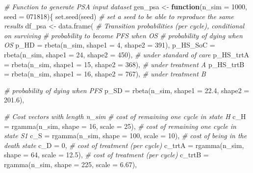 \documentclass[
]{article}
\newenvironment{Shaded}{\begin{snugshade}}{\end{snugshade}}
\newcommand{\AttributeTok}[1]{\textcolor[rgb]{0.77,0.63,0.00}{#1}}
\newcommand{\CommentTok}[1]{\textcolor[rgb]{0.56,0.35,0.01}{\textit{#1}}}
\newcommand{\ControlFlowTok}[1]{\textcolor[rgb]{0.13,0.29,0.53}{\textbf{#1}}}
\newcommand{\DecValTok}[1]{\textcolor[rgb]{0.00,0.00,0.81}{#1}}
\newcommand{\FloatTok}[1]{\textcolor[rgb]{0.00,0.00,0.81}{#1}}
\newcommand{\FunctionTok}[1]{\textcolor[rgb]{0.00,0.00,0.00}{#1}}
\newcommand{\NormalTok}[1]{#1}
\newcommand{\OtherTok}[1]{\textcolor[rgb]{0.56,0.35,0.01}{#1}}
\begin{document}
\begin{Shaded}
\begin{Highlighting}[]
\CommentTok{\# Function to generate PSA input dataset}
\NormalTok{gen\_psa }\OtherTok{\textless{}{-}} \ControlFlowTok{function}\NormalTok{(}\AttributeTok{n\_sim =} \DecValTok{1000}\NormalTok{, }\AttributeTok{seed =} \DecValTok{071818}\NormalTok{)\{}
  \FunctionTok{set.seed}\NormalTok{(seed) }\CommentTok{\# set a seed to be able to reproduce the same results}
\NormalTok{  df\_psa }\OtherTok{\textless{}{-}} \FunctionTok{data.frame}\NormalTok{(}
    \CommentTok{\# Transition probabilities (per cycle), conditional on surviving}
    \CommentTok{\# probability to become PFS when OS}
    \CommentTok{\# probability of dying when OS}
    \AttributeTok{p\_HD       =} \FunctionTok{rbeta}\NormalTok{(n\_sim, }\AttributeTok{shape1 =} \DecValTok{4}\NormalTok{,  }\AttributeTok{shape2 =} \DecValTok{391}\NormalTok{),}
    \AttributeTok{p\_HS\_SoC   =} \FunctionTok{rbeta}\NormalTok{(n\_sim, }\AttributeTok{shape1 =} \DecValTok{24}\NormalTok{, }\AttributeTok{shape2 =} \DecValTok{450}\NormalTok{),  }\CommentTok{\# under standard of care}
    \AttributeTok{p\_HS\_trtA  =} \FunctionTok{rbeta}\NormalTok{(n\_sim, }\AttributeTok{shape1 =} \DecValTok{15}\NormalTok{, }\AttributeTok{shape2 =} \DecValTok{368}\NormalTok{),  }\CommentTok{\# under treatment A}
    \AttributeTok{p\_HS\_trtB  =} \FunctionTok{rbeta}\NormalTok{(n\_sim, }\AttributeTok{shape1 =} \DecValTok{16}\NormalTok{, }\AttributeTok{shape2 =} \DecValTok{767}\NormalTok{),  }\CommentTok{\# under treatment B}
    
    \CommentTok{\# probability of dying when PFS}
    \AttributeTok{p\_SD       =} \FunctionTok{rbeta}\NormalTok{(n\_sim, }\AttributeTok{shape1 =} \FloatTok{22.4}\NormalTok{, }\AttributeTok{shape2 =} \FloatTok{201.6}\NormalTok{), }
    
    \CommentTok{\# Cost vectors with length n\_sim}
    \CommentTok{\# cost of remaining one cycle in state H}
    \AttributeTok{c\_H        =} \FunctionTok{rgamma}\NormalTok{(n\_sim, }\AttributeTok{shape =} \DecValTok{16}\NormalTok{, }\AttributeTok{scale =} \DecValTok{25}\NormalTok{), }
    \CommentTok{\# cost of remaining one cycle in state S1}
    \AttributeTok{c\_S        =} \FunctionTok{rgamma}\NormalTok{(n\_sim, }\AttributeTok{shape =} \DecValTok{100}\NormalTok{, }\AttributeTok{scale =} \DecValTok{10}\NormalTok{), }
    \CommentTok{\# cost of being in the death state}
    \AttributeTok{c\_D        =} \DecValTok{0}\NormalTok{, }
    \CommentTok{\# cost of treatment (per cycle)}
    \AttributeTok{c\_trtA    =} \FunctionTok{rgamma}\NormalTok{(n\_sim, }\AttributeTok{shape =} \DecValTok{64}\NormalTok{, }\AttributeTok{scale =} \FloatTok{12.5}\NormalTok{),}
    \CommentTok{\# cost of treatment (per cycle)}
    \AttributeTok{c\_trtB    =} \FunctionTok{rgamma}\NormalTok{(n\_sim, }\AttributeTok{shape =} \DecValTok{225}\NormalTok{, }\AttributeTok{scale =} \FloatTok{6.67}\NormalTok{),}
    

\end{Highlighting}
\end{Shaded}
\end{document}
